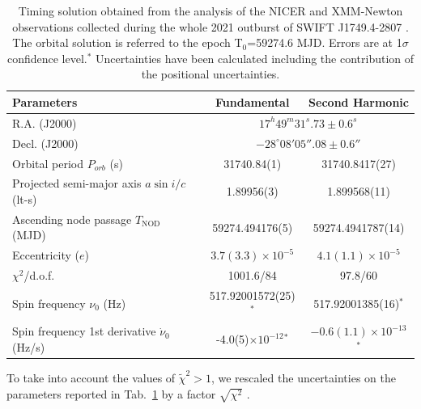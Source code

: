 \documentclass[fleqn,usenatbib]{mnras}
\newcommand{\swiftj}{SWIFT J1749.4-2807}
\newcommand{\nicer}{NICER}
\newcommand{\xmm}{XMM-Newton}
\begin{document}
\begin{table}

\begin{tabular}{l | c  c  }
\hline
Parameters             & Fundamental & Second Harmonic\\
\hline
\hline
R.A. (J2000) &  \multicolumn{2}{c}{$17^h49^m31^s.73\pm0.6^s$}\\
Decl. (J2000) & \multicolumn{2}{c}{$-28^\circ08'05''.08\pm0.6''$} \\
Orbital period $P_{orb}$ (s) & 31740.84(1) & 31740.8417(27)\\
Projected semi-major axis $a \sin i/c$ (lt-s) & 1.89956(3) &1.899568(11) \\
Ascending node passage $T_{\text{NOD}}$ (MJD) & 59274.494176(5) & 59274.4941787(14)\\
Eccentricity ($e$) & $3.7(3.3)\times 10^{-5}$ &$4.1(1.1)\times 10^{-5}$\\
$\chi^2$/d.o.f. &1001.6/84 & 97.8/60\\
\hline
\hline
Spin frequency $\nu_0$ (Hz) &517.92001572(25)$^*$& 517.92001385(16)$^*$\\
Spin frequency 1st derivative $\dot{\nu}_0$ (Hz/s) &-4.0(5)$\times 10^{-12}$$^*$&$-0.6(1.1)\times 10^{-13}$$^*$\\
\hline
\end{tabular}
\caption{Timing solution obtained from the analysis of the \nicer{} and \xmm{} observations collected during the whole 2021 outburst of \swiftj{} . The orbital solution is referred to the epoch T$_0$=59274.6 MJD. Errors are at 1$\sigma$ confidence level.$^*$ Uncertainties have been calculated including the contribution of the positional uncertainties.}
\label{tab:solution}
\end{table}

To take into account the values of $\tilde{\chi}^2>1$, we rescaled the uncertainties on the parameters reported in Tab.~\ref{tab:solution} by a factor $\sqrt{\chi^2}$ \citep[see e.g.][]{Finger:1999vb}.
\end{document}
